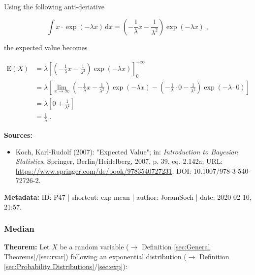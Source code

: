 \documentclass[a4paper,12pt,twoside]{book}
\begin{document}
Using the following anti-deriative

\begin{equation} \label{eq:exp-mean-exp-mean-s2}
\int x \cdot \exp(-\lambda x) \, \mathrm{d}x = \left( - \frac{1}{\lambda} x - \frac{1}{\lambda^2} \right) \exp(-\lambda x) \; ,
\end{equation}

the expected value becomes

\begin{equation} \label{eq:exp-mean-exp-mean-s3}
\begin{split}
\mathrm{E}(X) &= \lambda \left[ \left( - \frac{1}{\lambda} x - \frac{1}{\lambda^2} \right) \exp(-\lambda x) \right]_{0}^{+\infty} \\
&= \lambda \left[ \lim_{x \to \infty} \left( - \frac{1}{\lambda} x - \frac{1}{\lambda^2} \right) \exp(-\lambda x) - \left( - \frac{1}{\lambda} \cdot 0 - \frac{1}{\lambda^2} \right) \exp(-\lambda \cdot 0) \right] \\
&= \lambda \left[ 0 + \frac{1}{\lambda^2} \right] \\
&= \frac{1}{\lambda} \; .
\end{split}
\end{equation}


\vspace{1em}
\textbf{Sources:}
\begin{itemize}
\item Koch, Karl-Rudolf (2007): "Expected Value"; in: \textit{Introduction to Bayesian Statistics}, Springer, Berlin/Heidelberg, 2007, p. 39, eq. 2.142a; URL: \url{https://www.springer.com/de/book/9783540727231}; DOI: 10.1007/978-3-540-72726-2.
\end{itemize}


\vspace{1em}
\textbf{Metadata:} ID: P47 | shortcut: exp-mean | author: JoramSoch | date: 2020-02-10, 21:57.
\vspace{1em}



\subsubsection[\textbf{Median}]{Median} \label{sec:exp-med}
\setcounter{equation}{0}

\textbf{Theorem:} Let $X$ be a random variable ($\rightarrow$ Definition \ref{sec:General Theorems}/\ref{sec:rvar}) following an exponential distribution ($\rightarrow$ Definition \ref{sec:Probability Distributions}/\ref{sec:exp}):
\end{document}
